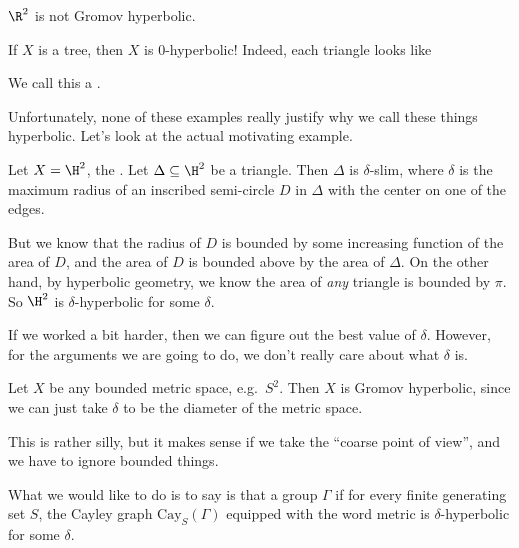 \documentclass[a4paper]{article}
\newcommand\Cay{\mathrm{Cay}}
\begin{document}
\begin{eg}
  $\R^2$ is not Gromov hyperbolic.
\end{eg}

\begin{eg}
  If $X$ is a tree, then $X$ is $0$-hyperbolic! Indeed, each triangle looks like
  \begin{center}
  \end{center}
  We call this a .
\end{eg}
Unfortunately, none of these examples really justify why we call these things hyperbolic. Let's look at the actual motivating example.

\begin{eg}
  Let $X = \H^2$, the . Let $\Delta \subseteq \H^2$ be a triangle. Then $\Delta$ is $\delta$-slim, where $\delta$ is the maximum radius of an inscribed semi-circle $D$ in $\Delta$ with the center on one of the edges.

  But we know that the radius of $D$ is bounded by some increasing function of the area of $D$, and the area of $D$ is bounded above by the area of $\Delta$. On the other hand, by hyperbolic geometry, we know the area of \emph{any} triangle is bounded by $\pi$. So $\H^2$ is $\delta$-hyperbolic for some $\delta$.
\end{eg}
If we worked a bit harder, then we can figure out the best value of $\delta$. However, for the arguments we are going to do, we don't really care about what $\delta$ is.

\begin{eg}
  Let $X$ be any bounded metric space, e.g.\ $S^2$. Then $X$ is Gromov hyperbolic, since we can just take $\delta$ to be the diameter of the metric space.
\end{eg}
This is rather silly, but it makes sense if we take the ``coarse point of view'', and we have to ignore bounded things.

What we would like to do is to say is that a group $\Gamma$ if for every finite generating set $S$, the Cayley graph $\Cay_S(\Gamma)$ equipped with the word metric is $\delta$-hyperbolic for some $\delta$.
\end{document}

